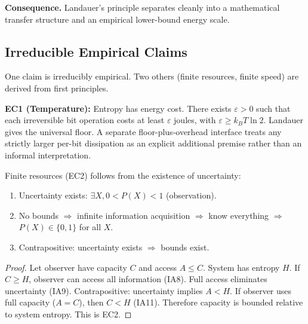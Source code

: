 \noindent\textbf{Consequence.} Landauer's principle separates cleanly into a mathematical transfer structure and an empirical lower-bound energy scale.

\subsection{Irreducible Empirical Claims}\label{sec:irreducible-empirical}

One claim is irreducibly empirical. Two others (finite resources, finite speed) are derived from first principles.

\begin{definition}\label{def:empirical-claims}
\textbf{EC1 (Temperature):} Entropy has energy cost. There exists $\varepsilon > 0$ such that each irreversible bit operation costs at least $\varepsilon$ joules, with $\varepsilon \geq k_B T \ln 2$. Landauer gives the universal floor. A separate floor-plus-overhead interface treats any strictly larger per-bit dissipation as an explicit additional premise rather than an informal interpretation.
\end{definition}

\begin{theorem}\label{thm:ec2-derived}
Finite resources (EC2) follows from the existence of uncertainty:
\begin{enumerate}
\item Uncertainty exists: $\exists X, 0 < P(X) < 1$ (observation).
\item No bounds $\Rightarrow$ infinite information acquisition $\Rightarrow$ know everything $\Rightarrow$ $P(X) \in \{0,1\}$ for all $X$.
\item Contrapositive: uncertainty exists $\Rightarrow$ bounds exist.
\end{enumerate}
\end{theorem}

\begin{proof}
Let observer have capacity $C$ and access $A \leq C$. System has entropy $H$. If $C \geq H$, observer can access all information (IA8). Full access eliminates uncertainty (IA9). Contrapositive: uncertainty implies $A < H$. If observer uses full capacity ($A = C$), then $C < H$ (IA11). Therefore capacity is bounded relative to system entropy. This is EC2.
\end{proof}


